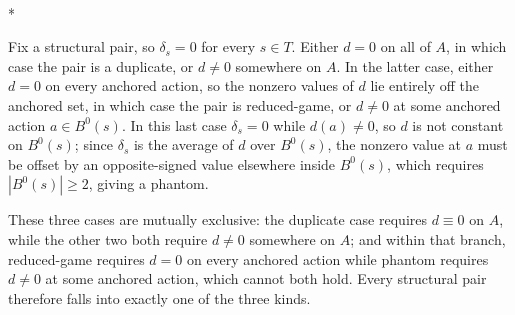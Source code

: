 \documentclass[12pt]{article}
\makeatletter
\theoremstyle{definition}
\renewenvironment{proof}[1][\proofname]{\par
  \pushQED{\qed}%
  \normalfont \topsep6\p@\@plus6\p@\relax
  \trivlist
  \item[\hskip\labelsep\itshape #1\@addpunct{.}]\mbox{}\\*
  \ignorespaces
}{%
  \popQED\endtrivlist\@endpefalse
}
\makeatother
\begin{document}
\begin{proof}[Proof of Remark \ref{rem:threekinds}]
Fix a structural pair, so $\delta_s = 0$ for every $s \in T$. Either $d = 0$ on all of $A$, in which case the pair is a duplicate, or $d \neq 0$ somewhere on $A$. In the latter case, either $d = 0$ on every anchored action, so the nonzero values of $d$ lie entirely off the anchored set, in which case the pair is reduced-game, or $d \neq 0$ at some anchored action $a \in B^0(s)$. In this last case $\delta_s = 0$ while $d(a) \neq 0$, so $d$ is not constant on $B^0(s)$; since $\delta_s$ is the average of $d$ over $B^0(s)$, the nonzero value at $a$ must be offset by an opposite-signed value elsewhere inside $B^0(s)$, which requires $|B^0(s)| \ge 2$, giving a phantom.

These three cases are mutually exclusive: the duplicate case requires $d \equiv 0$ on $A$, while the other two both require $d \neq 0$ somewhere on $A$; and within that branch, reduced-game requires $d = 0$ on every anchored action while phantom requires $d \neq 0$ at some anchored action, which cannot both hold. Every structural pair therefore falls into exactly one of the three kinds.
\end{proof}


\end{document}
